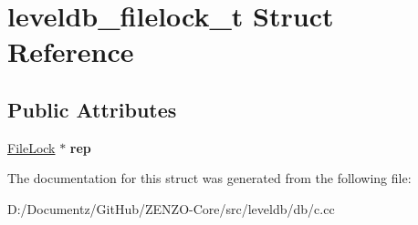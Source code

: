 \hypertarget{structleveldb__filelock__t}{}\section{leveldb\+\_\+filelock\+\_\+t Struct Reference}
\label{structleveldb__filelock__t}
\subsection*{Public Attributes}
\begin{DoxyCompactItemize}
\item 
\mbox{\label{structleveldb__filelock__t_a6c341dd7282427215e6b3ba47871a4f5}} 
\mbox{\hyperlink{classleveldb_1_1_file_lock}{File\+Lock}} $\ast$ {\bfseries rep}
\end{DoxyCompactItemize}


The documentation for this struct was generated from the following file\+:\begin{DoxyCompactItemize}
\item 
D\+:/\+Documentz/\+Git\+Hub/\+Z\+E\+N\+Z\+O-\/\+Core/src/leveldb/db/c.\+cc\end{DoxyCompactItemize}
